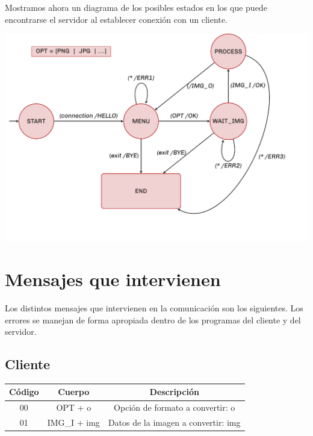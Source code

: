 \documentclass[11pt]{article}
\begin{document}
Mostramos ahora un diagrama de los posibles estados en los que puede encontrarse el servidor al establecer conexión con un cliente.
\begin{center}
	\includegraphics[width=.9\textwidth]{img/diagrama}
\end{center}	


\section{Mensajes que intervienen}

Los distintos mensajes que intervienen en la comunicación son los siguientes. Los errores se manejan de forma apropiada dentro de los programas del cliente y del servidor.

\subsection{Cliente}
\begin{center}
	\begin{tabular}{|c|c|c|}
	\hline
	Código & Cuerpo & Descripción\\
	\hline
	00 & OPT + o & Opción de formato a convertir: o\\
	\hline
	01 & IMG\_I + img & Datos de la imagen a convertir: img\\
	\hline
\end{tabular}
\end{center}
\end{document}
